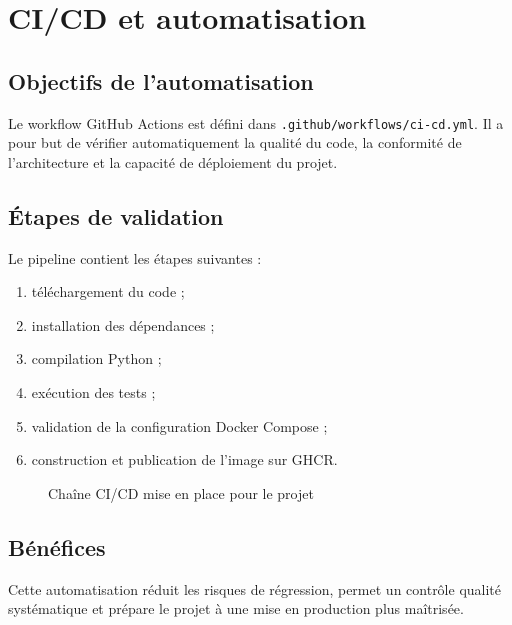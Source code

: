 \documentclass[11pt,a4paper]{report}
\begin{document}
\chapter{CI/CD et automatisation}
\section{Objectifs de l’automatisation}
Le workflow GitHub Actions est défini dans \texttt{.github/workflows/ci-cd.yml}. Il a pour but de vérifier automatiquement la qualité du code, la conformité de l’architecture et la capacité de déploiement du projet.

\section{Étapes de validation}
Le pipeline contient les étapes suivantes :
\begin{enumerate}[leftmargin=1.8em]
    \item téléchargement du code ;
    \item installation des dépendances ;
    \item compilation Python ;
    \item exécution des tests ;
    \item validation de la configuration Docker Compose ;
    \item construction et publication de l’image sur GHCR.
\end{enumerate}

\begin{figure}[H]
\centering
{}
\caption{Chaîne CI/CD mise en place pour le projet}
\end{figure}

\section{Bénéfices}
Cette automatisation réduit les risques de régression, permet un contrôle qualité systématique et prépare le projet à une mise en production plus maîtrisée.
\end{document}
